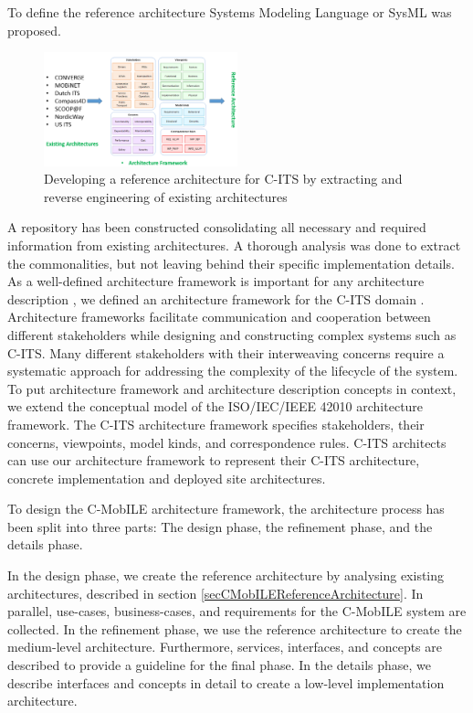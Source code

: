 \documentclass[conference]{IEEEtran}
\begin{document}
To define the reference architecture Systems Modeling Language or SysML was proposed.

\begin{figure}[ht!]
	\centering
	\includegraphics[width=0.5\textwidth]{methodology}
	\caption{Developing a reference architecture for C-ITS by extracting and reverse engineering of existing architectures}
	\label{methodology}
	\centering
	
\end{figure}

A repository has been constructed consolidating all necessary and required information from existing architectures.
A thorough analysis was done to extract the commonalities, but not leaving behind their specific implementation details.
As a well-defined architecture framework is important for any architecture description \cite{archframework}, we defined an architecture framework for the C-ITS domain \cite{ITSCongress}.
Architecture frameworks facilitate communication and cooperation between different stakeholders while designing and constructing complex systems such as C-ITS.
Many different stakeholders with their interweaving concerns require a systematic approach for addressing the complexity of the lifecycle of the system.
To put architecture framework and architecture description concepts in context, we extend the conceptual model of the ISO/IEC/IEEE 42010\cite{iso42010} architecture framework.
The C-ITS architecture framework specifies stakeholders, their concerns, viewpoints, model kinds, and correspondence rules.
C-ITS architects can use our architecture framework to represent their C-ITS architecture, concrete implementation and deployed site architectures.

To design the C-MobILE architecture framework, the architecture process has been split into three parts:
The design phase, the refinement phase, and the details phase.

In the design phase, we create the reference architecture by analysing existing architectures, described in section \ref{secCMobILEReferenceArchitecture}.
In parallel, use-cases, business-cases, and requirements for the C-MobILE system are collected.
In the refinement phase, we use the reference architecture to create the medium-level architecture.
Furthermore, services, interfaces, and concepts are described to provide a guideline for the final phase.
In the details phase, we describe interfaces and concepts in detail to create a low-level implementation architecture.
\end{document}
